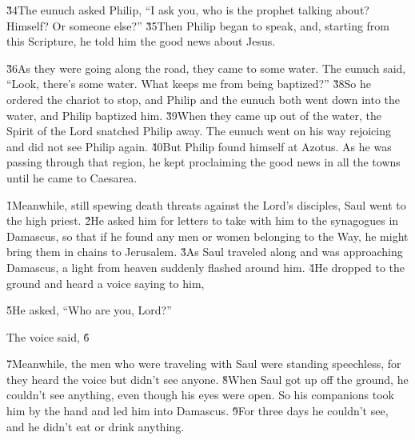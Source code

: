 \v{34}The eunuch asked Philip, ``I ask you, who is the prophet talking about? Himself? Or someone else?'' \v{35}Then Philip began to speak, and, starting from this Scripture, he told him the good news about Jesus.

\v{36}As they were going along the road, they came to some water. The eunuch said, ``Look, there's some water. What keeps me from being baptized?'' \v{38}So he ordered the chariot to stop, and Philip and the eunuch both went down into the water, and Philip baptized him. \v{39}When they came up out of the water, the Spirit of the Lord snatched Philip away. The eunuch went on his way rejoicing and did not see Philip again. \v{40}But Philip found himself at Azotus. As he was passing through that region, he kept proclaiming the good news in all the towns until he came to Caesarea.

\v{1}Meanwhile, still spewing death threats against the Lord's disciples, Saul went to the high priest. \v{2}He asked him for letters to take with him to the synagogues in Damascus, so that if he found any men or women belonging to the Way, he might bring them in chains to Jerusalem. \v{3}As Saul traveled along and was approaching Damascus, a light from heaven suddenly flashed around him. \v{4}He dropped to the ground and heard a voice saying to him, \red{!} 

\v{5}He asked, ``Who are you, Lord?''

The voice said,  \v{6}

\v{7}Meanwhile, the men who were traveling with Saul were standing speechless, for they heard the voice but didn't see anyone. \v{8}When Saul got up off the ground, he couldn't see anything, even though his eyes were open. So his companions took him by the hand and led him into Damascus. \v{9}For three days he couldn't see, and he didn't eat or drink anything.

